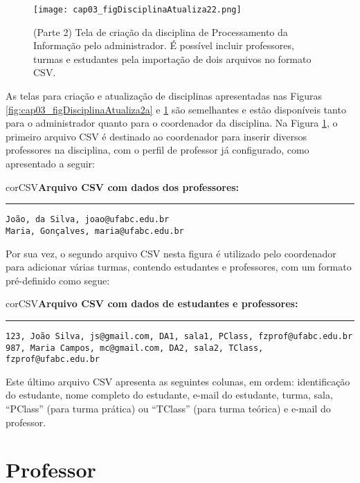 \begin{figure}[!ht]
  \centering
  \texttt{[image: cap03\_figDisciplinaAtualiza22.png]}
  \caption{(Parte 2) Tela de criação da disciplina de Processamento da Informação pelo administrador. É possível incluir professores, turmas e estudantes pela importação de dois arquivos no formato CSV.}
  \label{fig:cap03_figDisciplinaAtualiza22}
\end{figure}

As telas para criação e atualização de disciplinas apresentadas nas Figuras \ref{fig:cap03_figDisciplinaAtualiza2a} e \ref{fig:cap03_figDisciplinaAtualiza22} são semelhantes e estão disponíveis tanto para o administrador quanto para o coordenador da disciplina. 
Na Figura \ref{fig:cap03_figDisciplinaAtualiza22}, o primeiro arquivo CSV é destinado ao coordenador para inserir diversos professores na disciplina, com o perfil de professor já configurado, como apresentado a seguir:
\begin{myboxCode}{corCSV}{\textbf{Arquivo CSV com dados dos professores:}}\vspace{3mm}
\hrule
\begin{verbatim}
João, da Silva, joao@ufabc.edu.br
Maria, Gonçalves, maria@ufabc.edu.br
\end{verbatim}
\end{myboxCode}

Por sua vez, o segundo arquivo CSV nesta figura é utilizado pelo coordenador para adicionar várias turmas, contendo estudantes e professores, com um formato pré-definido como segue:
\begin{myboxCode}{corCSV}{\textbf{Arquivo CSV com dados de estudantes e professores:}}\vspace{3mm}
\hrule
\begin{verbatim}
123, João Silva, js@gmail.com, DA1, sala1, PClass, fzprof@ufabc.edu.br
987, Maria Campos, mc@gmail.com, DA2, sala2, TClass, fzprof@ufabc.edu.br
\end{verbatim}
\end{myboxCode}

Este último arquivo CSV apresenta as seguintes colunas, em ordem: identificação do estudante, nome completo do estudante, e-mail do estudante, turma, sala, ``PClass'' (para turma prática) ou ``TClass'' (para turma teórica) e e-mail do professor.


\section{Professor} \label{sec:professor}


